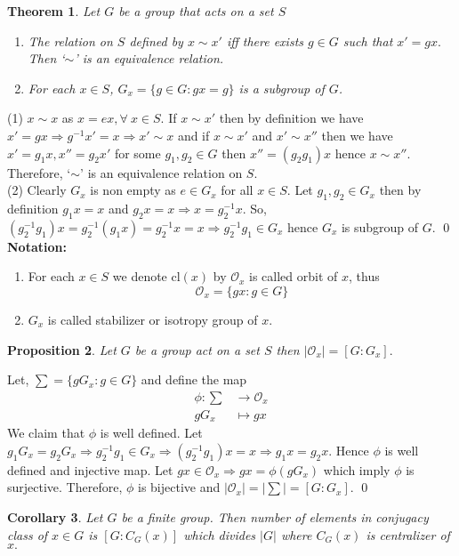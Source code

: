 \documentclass[11pt]{amsart}
\newtheorem{theorem}{Theorem}[section]
\newtheorem{proposition}[theorem]{Proposition}%
\newtheorem{corollary}[theorem]{Corollary}%
\newcommand{\cl}[1]{\text{cl}(#1)}
\begin{document}
\begin{theorem}
Let $G$ be a group that acts on a set $S$ \begin{enumerate}
\item The relation on $S$ defined by $x\sim x'$ iff there exists $g\in G$ such that $x'=gx.$ Then `$\sim$' is an equivalence relation.
\item For each $x\in S$, $G_x=\{g\in G:gx=g\}$ is a subgroup of $G$.
\end{enumerate}
\end{theorem}
\proof (1) $x\sim x$ as $x=ex,\forall~x\in S.$ If $x\sim x'$ then by definition we have $x'=gx \Rightarrow g^{-1}x'=x \Rightarrow x'\sim x$ and if $x\sim x'$ and $x'\sim x''$ then we have $x'=g_1x,x''=g_2x'$ for some $g_1,g_2\in G$ then $x''=(g_2g_1)x$ hence $x\sim x''$. Therefore, `$\sim$' is an equivalence relation on $S$.\\
(2) Clearly $G_x$ is non empty as $e\in G_x$ for all $x\in S.$ Let $g_1,g_2\in G_x$ then by definition $g_1x=x$ and $g_2x=x \Rightarrow x=g_2^{-1}x.$ So, $(g_2^{-1}g_1)x=g_2^{-1}(g_1x)=g_2^{-1}x=x \Rightarrow g_2^{-1}g_1\in G_x$ hence $G_x$ is subgroup of $G$. \qed\\
\textbf{Notation:} \begin{enumerate}
\item For each $x\in S$ we denote $\cl{x}$ by $\mathcal{O}_x$ is called orbit of $x$, thus $$\mathcal{O}_x=\{gx:g\in G\}$$
\item $G_x$ is called stabilizer or isotropy group of $x.$
\end{enumerate}
\begin{proposition}
Let $G$ be a group act on a set $S$ then $|\mathcal{O}_x|=[G:G_x].$
\end{proposition}
\proof Let, $\sum=\{gG_x:g\in G\}$ and define the map \begin{align*}
\phi:\sum&\to \mathcal{O}_x\\
gG_x&\mapsto gx
\end{align*}
We claim that $\phi$ is well defined. Let $g_1G_x=g_2G_x \Rightarrow g_2^{-1}g_1\in G_x \Rightarrow (g_2^{-1}g_1)x=x \Rightarrow g_1x=g_2x.$ Hence $\phi$ is well defined and injective map. Let $gx\in \mathcal{O}_x \Rightarrow gx=\phi(gG_x)$ which imply $\phi$ is surjective. Therefore, $\phi$ is bijective and $|\mathcal{O}_x|=|\sum|=[G:G_x].$ \qed
\begin{corollary}
Let $G$ be a finite group. Then number of elements in conjugacy class of $x\in G$ is $[G:C_G(x)]$ which divides $|G|$ where $C_G(x)$ is centralizer of $x.$
\end{corollary}
\end{document}
